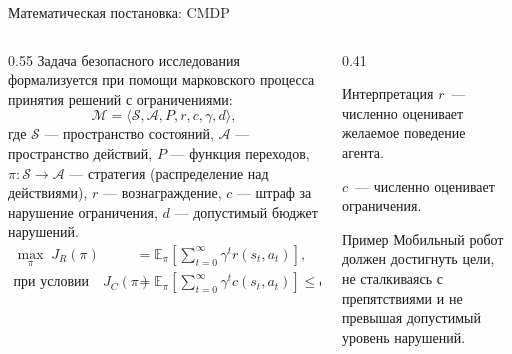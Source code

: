 \begin{frame}[shrink=10]{Математическая постановка: CMDP}
    \footnotesize
    \begin{columns}[T,onlytextwidth]
        \begin{column}{0.55\textwidth}
            Задача безопасного исследования формализуется при помощи
            марковского процесса принятия решений с ограничениями:
            \[
                \mathcal{M} =
                \langle \mathcal{S},\mathcal{A},P,r,c,\gamma,d \rangle ,
            \]
            где \(\mathcal{S}\) --- пространство состояний,
            \(\mathcal{A}\) --- пространство действий, \(P\) --- функция
            переходов, \(\pi: \mathcal{S} \to \mathcal{A}\) --- стратегия
            (распределение над действиями), \(r\) --- вознаграждение,
            \(c\) --- штраф за нарушение ограничения, \(d\) --- допустимый
            бюджет нарушений.
            \vspace{-0.4em}
            \begin{align*}
                \max_{\pi}\;
                J_R(\pi)
                &=
                \mathbb{E}_{\pi}\!\left[
                \sum_{t=0}^{\infty}\gamma^t r(s_t,a_t)\right], \\
                \text{при условии}\quad
                J_C(\pi)
                &=
                \mathbb{E}_{\pi}\!\left[
                \sum_{t=0}^{\infty}\gamma^t c(s_t,a_t)\right]\le d .
            \end{align*}
        \end{column}
        \begin{column}{0.41\textwidth}
            \begin{block}{Интерпретация}
                \scriptsize
                $r$~--- численно оценивает желаемое поведение агента.

                $c$~--- численно оценивает ограничения.
            \end{block}
            \begin{exampleblock}{Пример}
                \scriptsize
                Мобильный робот должен достигнуть цели, не сталкиваясь с
                препятствиями и не превышая допустимый уровень нарушений.
            \end{exampleblock}
        \end{column}
    \end{columns}
\end{frame}

